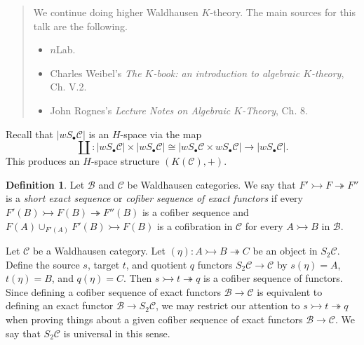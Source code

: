 \documentclass[10pt,letterpaper,cm]{nupset}
\theoremstyle{definition}
\newtheorem{definition}{Definition}
\theoremstyle{theorem}
\theoremstyle{remark}
\newcommand{\1}{\mathbf{1}}
\renewcommand{\b}{\mathscr{B}}
\renewcommand{\c}{\mathscr{C}}
\newcommand{\0}{\vec 0}
\begin{document}
\begin{abstract}
We continue doing higher Waldhausen $K$-theory. The main sources for this talk are the following.
\begin{itemize}
\item $n$Lab.
\item Charles Weibel's \textit{The $K$-book: an introduction to algebraic $K$-theory},  Ch. V.2.
\item John Rognes's \textit{Lecture Notes on Algebraic $K$-Theory}, Ch. 8.
\end{itemize}
\end{abstract}


Recall that $|wS_{\bullet} \c|$ is an $H$-space via the map $$\coprod: |wS_{\bullet} \c| \times |wS_{\bullet} \c| \cong |wS_{\bullet} \c \times  wS_{\bullet} \c|\to |wS_{\bullet} \c|.$$ This produces an $H$-space structure $\left(K(\c), +\right)$.


\begin{definition}
Let $\b$ and $\c$ be Waldhausen categories. We say that $F' \rightarrowtail F \twoheadrightarrow F''$ is a \textit{short exact sequence} or \textit{cofiber sequence of exact functors} if every $F'(B) \rightarrowtail F(B) \twoheadrightarrow F''(B)$ is a cofiber sequence and $F(A) \cup_{F'(A)} F'(B) \rightarrowtail F(B)$ is a cofibration in $\c$ for every $A \rightarrowtail B$ in $\b$.
\end{definition}

Let $\c$ be a Waldhausen category. Let $(\eta): A \rightarrowtail B \twoheadrightarrow C$ be an object in $S_2\c$. Define the source $s$, target $t$, and quotient $q$ functors $S_2\c \to \c$ by $s(\eta) = A$, $t(\eta) = B$, and $q(\eta) = C$. Then $s \rightarrowtail t \twoheadrightarrow q$ is a cofiber sequence of functors. Since defining a cofiber sequence of exact functors $\b \to \c$ is equivalent to defining an exact functor $\b \to S_2 \c$, we may restrict our attention to $s \rightarrowtail t \twoheadrightarrow q$ when proving things about a given cofiber sequence of exact functors $\b \to \c$. We say that $S_2\c$ is universal in this sense.
\end{document}
